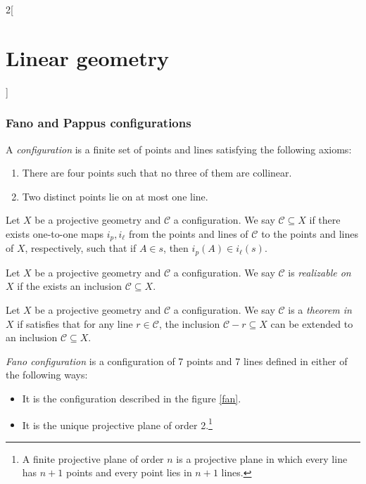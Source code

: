 \documentclass[class=article,10pt,crop=false]{standalone}
\begin{document}
\begin{multicols}{2}[\section{Linear geometry}]
\subsubsection{Fano and Pappus configurations}
\begin{definition}
A \textit{configuration} is a finite set of points and lines satisfying the following axioms:
\begin{enumerate}
    \item There are four points such that no three of them are collinear.
    \item Two distinct points lie on at most one line.
\end{enumerate}
\end{definition}
\begin{definition}
Let $X$ be a projective geometry and $\mathcal{C}$ a configuration. We say $\mathcal{C}\subseteq X$ if there exists one-to-one maps $i_p,i_\ell$ from the points and lines of $\mathcal{C}$ to the points and lines of $X$, respectively, such that if $A\in s$, then $i_p(A)\in i_\ell(s)$.
\end{definition}
\begin{definition}
Let $X$ be a projective geometry and $\mathcal{C}$ a configuration. We say $\mathcal{C}$ is \textit{realizable on $X$} if the exists an inclusion $\mathcal{C}\subseteq X$.
\end{definition}
\begin{definition}
Let $X$ be a projective geometry and $\mathcal{C}$ a configuration. We say $\mathcal{C}$ is a \textit{theorem in $X$} if satisfies that for any line $r\in\mathcal{C}$, the inclusion $\mathcal{C}-r\subseteq X$ can be extended to an inclusion $\mathcal{C}\subseteq X$.
\end{definition}
\begin{definition}
\textit{Fano configuration} is a configuration of 7 points and 7 lines defined in either of the following ways:
\begin{itemize}
    \item It is the configuration described in the figure \ref{fan}.
    \begin{figure}[h] 
        \centering
    \end{figure}  
    \item It is the unique projective plane of order 2.\footnote{A finite projective plane of order $n$ is a  projective plane in which every line has $n+1$ points and every point lies in $n+1$ lines.}

\end{itemize}
\end{definition}
\end{multicols}
\end{document}
